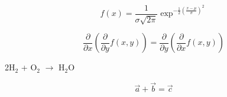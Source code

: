\documentclass[]{scrartcl}
\begin{document}
\begin{equation}
 f(x) = \frac{1}{\sigma \sqrt{2\pi}} \exp^{-\frac12
        \left( \frac{x-\mu}{\sigma}\right) ^2}
\end{equation}

\begin{equation*}
 \frac{\partial}{\partial x} \left(
  \frac{\partial}{\partial y} f(x,y)
 \right)
 =
 \frac{\partial}{\partial y} \left(
  \frac{\partial}{\partial x} f(x,y)
 \right)
\end{equation*}

2H$_2$ + O$_2$ $\rightarrow$ H$_2$O

\begin{equation}
 \vec{a} + \vec{b} = \vec{c}
\end{equation}
\end{document}
